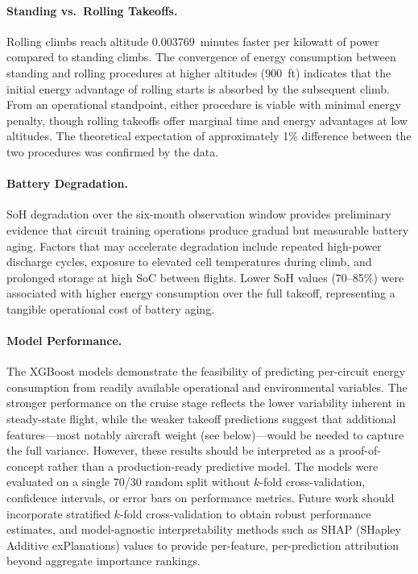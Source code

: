 \documentclass[11pt,a4paper]{article}
\begin{document}
\paragraph{Standing vs.\ Rolling Takeoffs.}
Rolling climbs reach altitude 0.003769~minutes faster per kilowatt of power compared to standing climbs.
The convergence of energy consumption between standing and rolling procedures at higher altitudes (900~ft) indicates that the initial energy advantage of rolling starts is absorbed by the subsequent climb.
From an operational standpoint, either procedure is viable with minimal energy penalty, though rolling takeoffs offer marginal time and energy advantages at low altitudes.
The theoretical expectation of approximately 1\% difference between the two procedures was confirmed by the data.

\paragraph{Battery Degradation.}
SoH degradation over the six-month observation window provides preliminary evidence that circuit training operations produce gradual but measurable battery aging.
Factors that may accelerate degradation include repeated high-power discharge cycles, exposure to elevated cell temperatures during climb, and prolonged storage at high SoC between flights.
Lower SoH values (70--85\%) were associated with higher energy consumption over the full takeoff, representing a tangible operational cost of battery aging.

\paragraph{Model Performance.}
The XGBoost models demonstrate the feasibility of predicting per-circuit energy consumption from readily available operational and environmental variables.
The stronger performance on the cruise stage reflects the lower variability inherent in steady-state flight, while the weaker takeoff predictions suggest that additional features---most notably aircraft weight (see below)---would be needed to capture the full variance.
However, these results should be interpreted as a proof-of-concept rather than a production-ready predictive model.
The models were evaluated on a single 70/30 random split without $k$-fold cross-validation, confidence intervals, or error bars on performance metrics.
Future work should incorporate stratified $k$-fold cross-validation to obtain robust performance estimates, and model-agnostic interpretability methods such as SHAP (SHapley Additive exPlanations) values to provide per-feature, per-prediction attribution beyond aggregate importance rankings.
\end{document}
